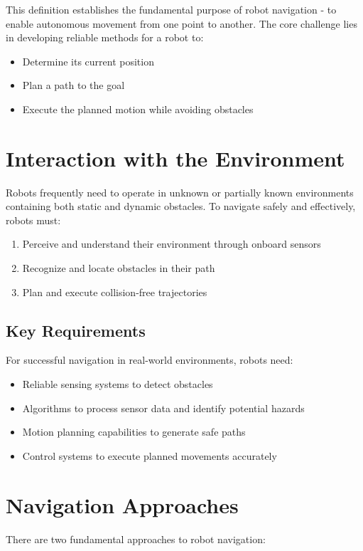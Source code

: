 \documentclass[openany]{book}
\theoremstyle{definition}
\theoremstyle{remark}
\begin{document}
This definition establishes the fundamental purpose of robot navigation - to enable autonomous movement from one point to another. The core challenge lies in developing reliable methods for a robot to:
\begin{itemize}
    \item Determine its current position
    \item Plan a path to the goal
    \item Execute the planned motion while avoiding obstacles
\end{itemize}

\section{Interaction with the Environment}

Robots frequently need to operate in unknown or partially known environments containing both static and dynamic obstacles. To navigate safely and effectively, robots must:

\begin{enumerate}
    \item Perceive and understand their environment through onboard sensors
    \item Recognize and locate obstacles in their path
    \item Plan and execute collision-free trajectories
\end{enumerate}

\subsection{Key Requirements}
For successful navigation in real-world environments, robots need:
\begin{itemize}
    \item Reliable sensing systems to detect obstacles
    \item Algorithms to process sensor data and identify potential hazards
    \item Motion planning capabilities to generate safe paths
    \item Control systems to execute planned movements accurately
\end{itemize}

\section{Navigation Approaches}

There are two fundamental approaches to robot navigation:
\end{document}

